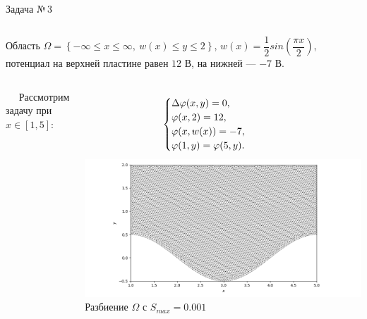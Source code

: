 \documentclass[ignoreonframetext,xcolor=table, unicode, 10pt]{beamer}
\renewcommand{\phi}{\varphi}
\begin{document}
\begin{frame}{Задача №\,3}
	\normalsize
	\vspace*{2mm}
	\begin{columns}[]
		Область $\Omega = \left\{ -\infty \leqslant x \leqslant \infty, \  w(x) \leqslant y \leqslant 2 \right\}$, $w(x) = \dfrac{1}{2} sin \left(\dfrac{\pi x}{2} \right)$,
		потенциал на верхней пластине равен $12$ В, на нижней --- $-7$ В.
		
	\end{columns}
	\vspace*{5mm}
	\begin{columns}[]
		\ \ \! Рассмотрим задачу при $x \in \left[ 1, 5 \right]$:
		
		\begin{equation*}\hspace*{-10mm}
			\begin{cases}
				\Delta \phi (x, y)  = 0, \\
				\phi (x, 2) = 12, \\
				\phi (x, w(x)) = -7, \\
				\phi (1, y) = \phi (5, y).\\
			\end{cases}
		\end{equation*}
		\vspace*{-2mm}
		\centering \hspace*{-16mm}
		\includegraphics[width=1.1\columnwidth]{Test_domain_1_1_sin_mesh_0001_calfem_net_1.png}\\
		\hspace*{-14.5mm} Разбиение $\Omega$ с $S_{max} = 0.001$
		

\end{columns}
\end{frame}
\end{document}
